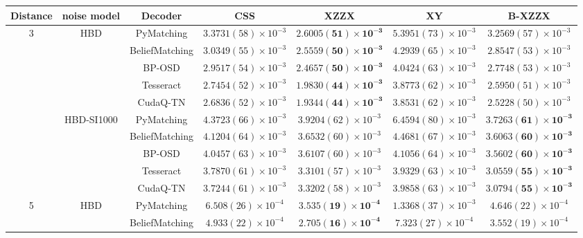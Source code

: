 \begin{tabular}{ccc|cccc}
    Distance & noise model & Decoder & CSS & XZZX & XY & B-XZZX \\
    \hline
    \multirow{10}{*}{3} & \multirow{5}{*}{HBD} & PyMatching & $3.3731(58) \times 10^{-3}$ & $\mathbf{2.6005(51) \times 10^{-3}}$ & $5.3951(73) \times 10^{-3}$ & $3.2569(57) \times 10^{-3}$ \\
     &  & BeliefMatching & $3.0349(55) \times 10^{-3}$ & $\mathbf{2.5559(50) \times 10^{-3}}$ & $4.2939(65) \times 10^{-3}$ & $2.8547(53) \times 10^{-3}$ \\
     &  & BP-OSD & $2.9517(54) \times 10^{-3}$ & $\mathbf{2.4657(50) \times 10^{-3}}$ & $4.0424(63) \times 10^{-3}$ & $2.7748(53) \times 10^{-3}$ \\
     &  & Tesseract & $2.7454(52) \times 10^{-3}$ & $\mathbf{1.9830(44) \times 10^{-3}}$ & $3.8773(62) \times 10^{-3}$ & $2.5950(51) \times 10^{-3}$ \\
     &  & CudaQ-TN & $2.6836(52) \times 10^{-3}$ & $\mathbf{1.9344(44) \times 10^{-3}}$ & $3.8531(62) \times 10^{-3}$ & $2.5228(50) \times 10^{-3}$ \\
    \cline{2-7}
     & \multirow{5}{*}{HBD-SI1000} & PyMatching & $4.3723(66) \times 10^{-3}$ & $3.9204(62) \times 10^{-3}$ & $6.4594(80) \times 10^{-3}$ & $\mathbf{3.7263(61) \times 10^{-3}}$ \\
     &  & BeliefMatching & $4.1204(64) \times 10^{-3}$ & $3.6532(60) \times 10^{-3}$ & $4.4681(67) \times 10^{-3}$ & $\mathbf{3.6063(60) \times 10^{-3}}$ \\
     &  & BP-OSD & $4.0457(63) \times 10^{-3}$ & $3.6107(60) \times 10^{-3}$ & $4.1056(64) \times 10^{-3}$ & $\mathbf{3.5602(60) \times 10^{-3}}$ \\
     &  & Tesseract & $3.7870(61) \times 10^{-3}$ & $3.3101(57) \times 10^{-3}$ & $3.9329(63) \times 10^{-3}$ & $\mathbf{3.0559(55) \times 10^{-3}}$ \\
     &  & CudaQ-TN & $3.7244(61) \times 10^{-3}$ & $3.3202(58) \times 10^{-3}$ & $3.9858(63) \times 10^{-3}$ & $\mathbf{3.0794(55) \times 10^{-3}}$ \\
    \hline
    \multirow{8}{*}{5} & \multirow{4}{*}{HBD} & PyMatching & $6.508(26) \times 10^{-4}$ & $\mathbf{3.535(19) \times 10^{-4}}$ & $1.3368(37) \times 10^{-3}$ & $4.646(22) \times 10^{-4}$ \\
     &  & BeliefMatching & $4.933(22) \times 10^{-4}$ & $\mathbf{2.705(16) \times 10^{-4}}$ & $7.323(27) \times 10^{-4}$ & $3.552(19) \times 10^{-4}$ \\

\end{tabular}
